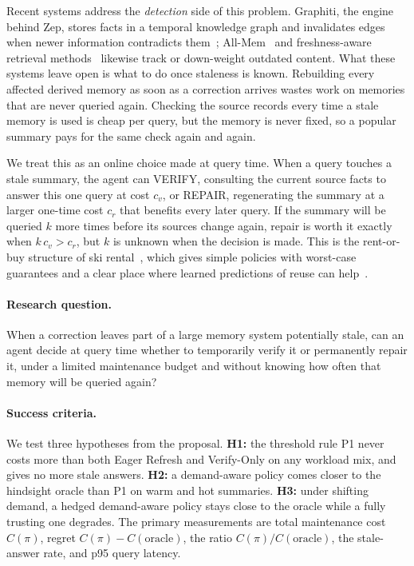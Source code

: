 \documentclass{article}
\begin{document}
Recent systems address the \emph{detection} side of this problem. Graphiti, the
engine behind Zep, stores facts in a temporal knowledge graph and invalidates
edges when newer information contradicts them~\citep{rasmussen2025zep};
All-Mem~\citep{lv2026allmem} and freshness-aware retrieval
methods~\citep{vectorize2026staleness} likewise track or down-weight outdated
content. What these systems leave open is what to do once staleness is known.
Rebuilding every affected derived memory as soon as a correction arrives wastes
work on memories that are never queried again. Checking the source records
every time a stale memory is used is cheap per query, but the memory is never
fixed, so a popular summary pays for the same check again and again.

We treat this as an online choice made at query time. When a query touches a
stale summary, the agent can VERIFY, consulting the current source facts to
answer this one query at cost $c_v$, or REPAIR, regenerating the summary at a
larger one-time cost $c_r$ that benefits every later query. If the summary will
be queried $k$ more times before its sources change again, repair is worth it
exactly when $k\,c_v > c_r$, but $k$ is unknown when the decision is made. This
is the rent-or-buy structure of ski rental~\citep{karlin1988snoopy}, which
gives simple policies with worst-case guarantees and a clear place where
learned predictions of reuse can help~\citep{purohit2018improving}.

\paragraph{Research question.} When a correction leaves part of a large memory
system potentially stale, can an agent decide at query time whether to
temporarily verify it or permanently repair it, under a limited maintenance
budget and without knowing how often that memory will be queried again?

\paragraph{Success criteria.} We test three hypotheses from the proposal.
\textbf{H1:} the threshold rule P1 never costs more than both Eager Refresh and
Verify-Only on any workload mix, and gives no more stale answers.
\textbf{H2:} a demand-aware policy comes closer to the hindsight oracle than P1
on warm and hot summaries. \textbf{H3:} under shifting demand, a hedged
demand-aware policy stays close to the oracle while a fully trusting one
degrades. The primary measurements are total maintenance cost $C(\pi)$, regret
$C(\pi)-C(\mathrm{oracle})$, the ratio $C(\pi)/C(\mathrm{oracle})$, the
stale-answer rate, and p95 query latency.
\end{document}
